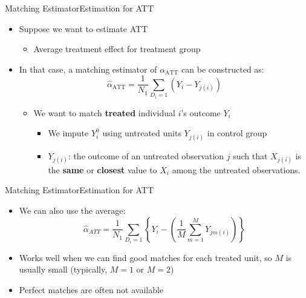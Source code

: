 \documentclass[dvipsnames,hyperref={pdfpagelabels=false}]{beamer}
\begin{document}
\begin{frame}{Matching Estimator}{Estimation for ATT}
	\begin{itemize}

		\item Suppose we want to estimate ATT
		\vspace{0.3cm}
			\begin{itemize}
			\item Average treatment effect for treatment group
					\vspace{0.3cm}
		\end{itemize}
		\item In that case, a matching estimator of $\alpha_{\text{ATT}}$ can be constructed as:
		\begin{equation*}
		\hat{\alpha}_{\text{ATT}}=\dfrac{1}{N_1}\sum_{D_i=1}(Y_i-Y_{j(i)})
		\end{equation*}
		
			\begin{itemize}
			\item We want to match \textbf{treated} individual $i$'s outcome $Y_i$
		\vspace{0.3cm}
					\begin{itemize}
		\item We impute $Y^{0}_{i}$ using untreated units $Y_{j(i)}$ in control group
				\vspace{0.3cm}
		\item $Y_{j(i)}$: the outcome of an untreated observation $j$ such that $X_{j(i)}$ is the \textbf{same} or \textbf{closest} value to $X_i$ among the untreated observations. 
					\end{itemize}
			\end{itemize}
		
	\end{itemize}
\end{frame}


\begin{frame}{Matching Estimator}{Estimation for ATT}
\begin{itemize}
	
\item We can also use the average:
	\begin{equation*}
	\hat{\alpha}_{\text{}ATT}=\dfrac{1}{N_1}\sum_{D_i=1}\left\lbrace Y_i-\left(\dfrac{1}{M}\sum^M_{m=1}Y_{jm(i)}\right)\right\rbrace
	\end{equation*}
\item Works well when we can find good matches for each treated unit, so $M$ is usually small (typically, $M=1$ or $M=2$)
\vspace{0.3cm}
		\item Perfect matches are often not available 

\end{itemize}
\end{frame}
\end{document}
